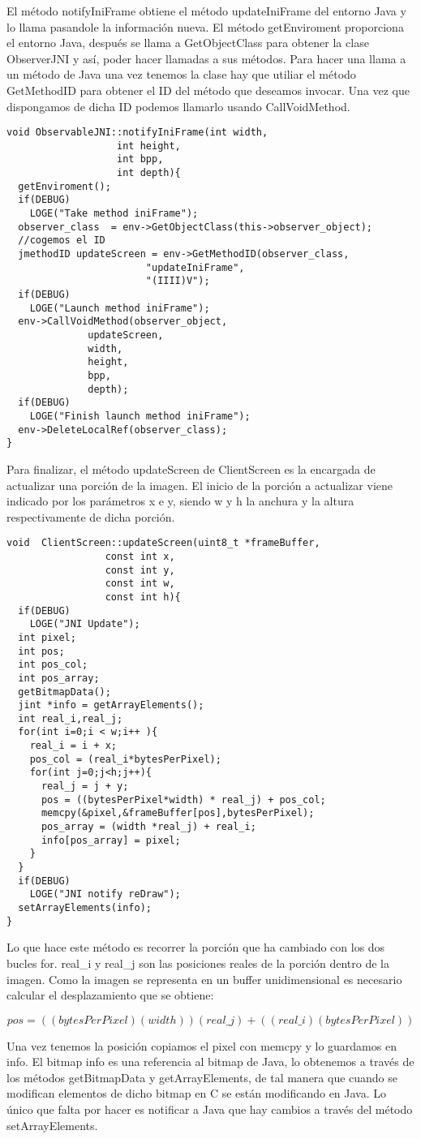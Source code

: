 El método notifyIniFrame obtiene el método updateIniFrame del entorno Java y lo llama pasandole la información nueva. El método getEnviroment proporciona el entorno Java, después se llama a GetObjectClass para obtener la clase ObserverJNI y así, poder hacer llamadas a sus métodos. Para hacer una llama a un método de Java una vez tenemos la clase hay que utiliar el método GetMethodID para obtener el ID del método que deseamos invocar. Una vez que dispongamos de dicha ID podemos llamarlo usando CallVoidMethod.
\begin{lstlisting}
void ObservableJNI::notifyIniFrame(int width,
				   int height,
				   int bpp,
				   int depth){
  getEnviroment();
  if(DEBUG)
    LOGE("Take method iniFrame");
  observer_class  = env->GetObjectClass(this->observer_object);
  //cogemos el ID
  jmethodID updateScreen = env->GetMethodID(observer_class,
					    "updateIniFrame",
					    "(IIII)V");
  if(DEBUG)
    LOGE("Launch method iniFrame");
  env->CallVoidMethod(observer_object,
		      updateScreen,
		      width,
		      height,
		      bpp,
		      depth);
  if(DEBUG)
    LOGE("Finish launch method iniFrame");
  env->DeleteLocalRef(observer_class);
}
\end{lstlisting}

Para finalizar, el método updateScreen de ClientScreen es la encargada de actualizar una porción de la imagen. El inicio de la porción a actualizar viene indicado por los parámetros x e y, siendo w y h la anchura y la altura respectivamente de dicha porción.
\begin{lstlisting}
void  ClientScreen::updateScreen(uint8_t *frameBuffer,
				 const int x,
				 const int y,
				 const int w,
				 const int h){
  if(DEBUG)
    LOGE("JNI Update");
  int pixel;
  int pos;
  int pos_col;
  int pos_array;
  getBitmapData();
  jint *info = getArrayElements();
  int real_i,real_j;
  for(int i=0;i < w;i++ ){
    real_i = i + x;
    pos_col = (real_i*bytesPerPixel);
    for(int j=0;j<h;j++){
      real_j = j + y;
      pos = ((bytesPerPixel*width) * real_j) + pos_col;
      memcpy(&pixel,&frameBuffer[pos],bytesPerPixel);
      pos_array = (width *real_j) + real_i;
      info[pos_array] = pixel;
    }
  }
  if(DEBUG)
    LOGE("JNI notify reDraw");
  setArrayElements(info);
}
\end{lstlisting}

Lo que hace este método es recorrer la porción que ha cambiado con los dos bucles for. real\_i y real\_j son las posiciones reales de la porción dentro de la imagen. Como la imagen se representa en un buffer unidimensional es necesario calcular el desplazamiento que se obtiene:

\begin{equation*}
pos = ((bytesPerPixel)(width))(real\_j)+((real\_i)(bytesPerPixel))
\end{equation*}

Una vez tenemos la posición copiamos el pixel con memcpy y lo guardamos en info. El bitmap info es una referencia al bitmap de Java, lo obtenemos a través de los métodos getBitmapData y getArrayElements, de tal manera que cuando se modifican elementos de dicho bitmap en C se están modificando en Java. Lo único que falta por hacer es notificar a Java que hay cambios a través del método setArrayElements.
